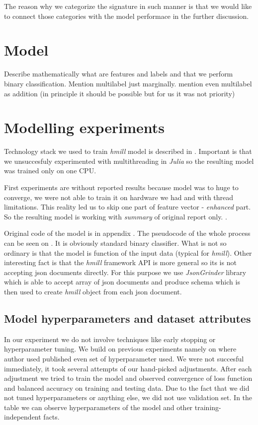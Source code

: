 The reason why we categorize the signature in such manner is that we would like to connect those categories with the model performace in the further discussion.

\section{Model}
Describe mathematically what are features and labels and that we perform binary classification. Mention multilabel just marginally.
mention even multilabel as addition (in principle it should be possible but for us it was not priority)

\section{Modelling experiments}
Technology stack we used to train \emph{hmill} model is described in . Important is that we unsuccesfuly experimented with multithreading in \emph{Julia} so the resulting model was trained only on one CPU.

First experiments are without reported results because model was to huge to converge, we were not able to train it on hardware we had and with thread limitations. This reality led us to skip one part of feature vector - \emph{enhanced} part. So the resulting model is working with \emph{summary} of original report only. .

Original code of the model is in appendix . The pseudocode of the whole process can be seen on . It is obviously standard binary classifier. What is not so ordinary is that the model is function of the input data (typical for \emph{hmill}). Other interesting fact is that the \emph{hmill} framework API is more general so its is not accepting json documents directly. For this purpose we use \emph{JsonGrinder} library  which is able to accept array of json documents and produce schema  which is then used to create \emph{hmill} object from each json document.

\subsection{Model hyperparameters and dataset attributes}
In our experiment we do not involve techniques like early stopping or hyperparameter tuning. We build on previous experiments namely on \cite{Mandlik2020} where author used published even set of hyperparameter used. We were not succesful immediately, it took several attempts of our hand-picked adjustments. After each adjustment we tried to train the model and observed convergence of loss function and balanced accuracy on training and testing data. Due to the fact that we did not tuned hyperparameters or anything else, we did not use validation set. In the table  we can observe hyperparameters of the model and other training-independent facts.

